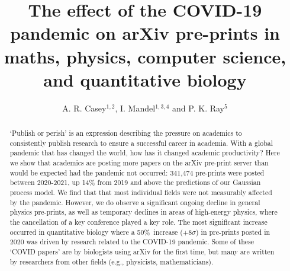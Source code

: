 \documentclass[]{rsos}%
\newcommand{\change}[1]{\textbf{#1}}
\begin{document}
\title{\change{The effect of the COVID-19 pandemic on arXiv pre-prints in maths, physics, computer science, and quantitative biology}}


\author{%
A. R. Casey$^{1,2}$,  I. Mandel$^{1,3,4}$ and P. K. Ray$^{5}$}

\address{$^1$School of Physics \& Astronomy, Monash University, Clayton 3800, Victoria, Australia\\
$^2$ARC Centre of Excellence for Astrophysics in Three Dimensions (ASTRO-3D), Australia\\
$^3$OzGrav, Australian Research Council Centre of Excellence for Gravitational Wave Discovery, Australia\\
$^4$Institute of Gravitational Wave Astronomy and School of Physics and Astronomy, University of Birmingham, Birmingham, B15 2TT, United Kingdom\\
$^5$Department of Mathematics, Imperial College London, London, United Kingdom
}

\subject{xxxxx, xxxxx, xxxx}



\begin{abstract}
`Publish or perish’ is an expression describing the pressure on academics to consistently publish research to ensure a successful career in academia. 
With a global pandemic that has changed the world, how has it changed academic productivity? 
Here we show that academics are posting more papers on the arXiv pre-print server than would be expected had the pandemic not occurred: 341,474 pre-prints were posted between 2020-2021, up 14\% from 2019 and above the predictions of our Gaussian process model.
We find that that most individual fields were not measurably affected by the pandemic.
However, we do observe a significant ongoing decline in general physics pre-prints, as well as temporary declines in areas of high-energy physics, where the cancellation of a key conference played a key role.
The most significant increase occurred in quantitative biology where a 50\%~increase ($+8\sigma$) in pre-prints posted in 2020 was driven by research related to the COVID-19 pandemic. 
Some of these `COVID papers' are by biologists using arXiv for the first time, but many are written by researchers from other fields (e.g., physicists, mathematicians). 
\end{abstract}
\end{document}
